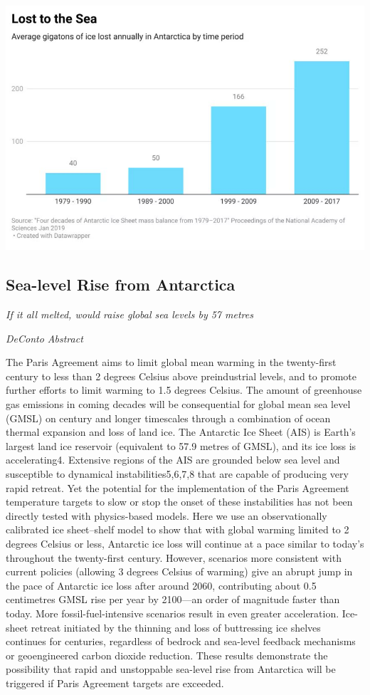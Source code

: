\documentclass[
]{book}
\begin{document}
\includegraphics{fig/Antarctica_Ice_Loss_to_Sea.jpeg}

\hypertarget{sea-level-rise-from-antarctica}{%
\subsection{Sea-level Rise from Antarctica}\label{sea-level-rise-from-antarctica}}

\emph{If it all melted, would raise global sea levels by 57 metres}

\emph{DeConto Abstract}

The Paris Agreement aims to limit global mean warming in the twenty-first century to less than 2 degrees Celsius above preindustrial levels, and to promote further efforts to limit warming to 1.5 degrees Celsius. The amount of greenhouse gas emissions in coming decades will be consequential for global mean sea level (GMSL) on century and longer timescales through a combination of ocean thermal expansion and loss of land ice. The Antarctic Ice Sheet (AIS) is Earth's largest land ice reservoir (equivalent to 57.9 metres of GMSL), and its ice loss is accelerating4. Extensive regions of the AIS are grounded below sea level and susceptible to dynamical instabilities5,6,7,8 that are capable of producing very rapid retreat. Yet the potential for the implementation of the Paris Agreement temperature targets to slow or stop the onset of these instabilities has not been directly tested with physics-based models. Here we use an observationally calibrated ice sheet--shelf model to show that with global warming limited to 2 degrees Celsius or less, Antarctic ice loss will continue at a pace similar to today's throughout the twenty-first century. However, scenarios more consistent with current policies (allowing 3 degrees Celsius of warming) give an abrupt jump in the pace of Antarctic ice loss after around 2060, contributing about 0.5 centimetres GMSL rise per year by 2100---an order of magnitude faster than today. More fossil-fuel-intensive scenarios result in even greater acceleration. Ice-sheet retreat initiated by the thinning and loss of buttressing ice shelves continues for centuries, regardless of bedrock and sea-level feedback mechanisms or geoengineered carbon dioxide reduction. These results demonstrate the possibility that rapid and unstoppable sea-level rise from Antarctica will be triggered if Paris Agreement targets are exceeded.
\end{document}
